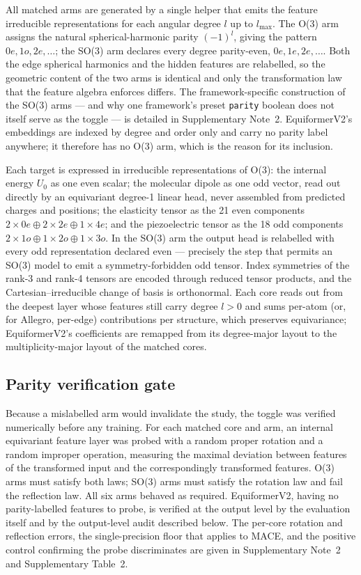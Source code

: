 All matched arms are generated by a single helper that emits the feature irreducible representations for each angular degree $l$ up to $l_{\max}$. The O(3) arm assigns the natural spherical-harmonic parity $(-1)^{l}$, giving the pattern $0e, 1o, 2e, \dots$; the SO(3) arm declares every degree parity-even, $0e, 1e, 2e, \dots$. Both the edge spherical harmonics and the hidden features are relabelled, so the geometric content of the two arms is identical and only the transformation law that the feature algebra enforces differs. The framework-specific construction of the SO(3) arms --- and why one framework's preset \texttt{parity} boolean does not itself serve as the toggle --- is detailed in Supplementary Note~2. EquiformerV2's embeddings are indexed by degree and order only and carry no parity label anywhere; it therefore has no O(3) arm, which is the reason for its inclusion.

Each target is expressed in irreducible representations of O(3): the internal energy $U_0$ as one even scalar; the molecular dipole as one odd vector, read out directly by an equivariant degree-1 linear head, never assembled from predicted charges and positions; the elasticity tensor as the 21 even components $2\times0e \oplus 2\times2e \oplus 1\times4e$; and the piezoelectric tensor as the 18 odd components $2\times1o \oplus 1\times2o \oplus 1\times3o$. In the SO(3) arm the output head is relabelled with every odd representation declared even --- precisely the step that permits an SO(3) model to emit a symmetry-forbidden odd tensor. Index symmetries of the rank-3 and rank-4 tensors are encoded through reduced tensor products, and the Cartesian--irreducible change of basis is orthonormal. Each core reads out from the deepest layer whose features still carry degree $l>0$ and sums per-atom (or, for Allegro, per-edge) contributions per structure, which preserves equivariance; EquiformerV2's coefficients are remapped from its degree-major layout to the multiplicity-major layout of the matched cores.

\subsection*{Parity verification gate}

Because a mislabelled arm would invalidate the study, the toggle was verified numerically before any training. For each matched core and arm, an internal equivariant feature layer was probed with a random proper rotation and a random improper operation, measuring the maximal deviation between features of the transformed input and the correspondingly transformed features. O(3) arms must satisfy both laws; SO(3) arms must satisfy the rotation law and fail the reflection law. All six arms behaved as required. EquiformerV2, having no parity-labelled features to probe, is verified at the output level by the evaluation itself and by the output-level audit described below. The per-core rotation and reflection errors, the single-precision floor that applies to MACE, and the positive control confirming the probe discriminates are given in Supplementary Note~2 and Supplementary Table~2.

